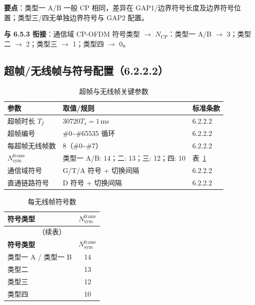 \documentclass[11pt,a4paper]{ctexart}
\begin{document}
\textbf{要点}：类型一 A/B 一般 CP 相同，差异在 GAP1/边界符号长度及边界符号位置；类型三/四无单独边界符号与 GAP2 配置。

\textbf{与 6.5.3 衔接}：通信域 CP-OFDM 符号类型 $\rightarrow$ $N_{\mathrm{CP}}$：类型一 A/B $\rightarrow$ 3；类型二 $\rightarrow$ 2；类型三 $\rightarrow$ 1；类型四 $\rightarrow$ 0。

\subsection{超帧/无线帧与符号配置（6.2.2.2）}

\begin{longtable}{lll}
\caption{超帧与无线帧关键参数} \\
\toprule
\textbf{参数} & \textbf{取值/规则} & \textbf{标准条款} \\
\midrule
超帧时长 $T_f$ & $30720 T_s = 1$\,ms & 6.2.2.2 \\
超帧编号 & \#0\textasciitilde\#65535 循环 & 6.2.2.2 \\
每超帧无线帧数 & 8（\#0\textasciitilde\#7） & 6.2.2.2 \\
$N_{\mathrm{sym}}^{\mathrm{frame}}$ & 类型一 A/B: 14；二: 13；三: 12；四: 10 & 表~\ref{tab:622-sym-per-frame} \\
通信域符号 & G/T/A 符号 + 切换间隔 & 6.2.2.2 \\
直通链路符号 & D 符号 + 切换间隔 & 6.2.2.2 \\
\bottomrule
\end{longtable}

\begin{longtable}{lc}
\caption{每无线帧符号数\label{tab:622-sym-per-frame}} \\
\toprule
\textbf{符号类型} & \textbf{$N_{\mathrm{sym}}^{\mathrm{frame}}$} \\
\midrule
\endfirsthead
\multicolumn{2}{c}{\small（续表）} \\
\toprule
\textbf{符号类型} & \textbf{$N_{\mathrm{sym}}^{\mathrm{frame}}$} \\
\midrule
\endhead
\bottomrule
\endfoot
类型一 A / 类型一 B & 14 \\
类型二 & 13 \\
类型三 & 12 \\
类型四 & 10 \\
\end{longtable}
\end{document}
